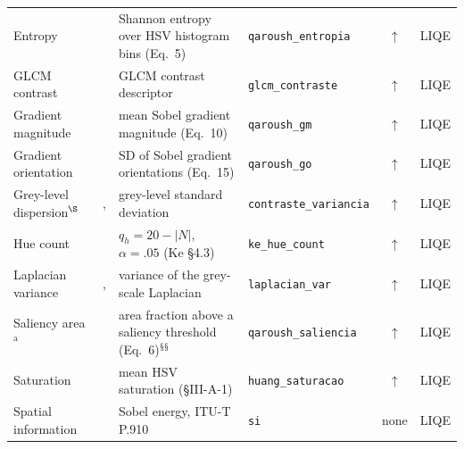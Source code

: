 \begin{table}[!ht]
\begin{tabular}{@{}>{\raggedright\arraybackslash}p{2.15cm}>{\raggedright\arraybackslash}p{1.95cm}>{\raggedright\arraybackslash}p{3.70cm}>{\raggedright\arraybackslash}p{2.55cm}c c@{}}
Entropy & \citep{qaroush2025diversity} & Shannon entropy over HSV histogram bins (Eq.~5) & \texttt{qaroush\_\allowbreak{}entropia} & $\uparrow$ & LIQE \\
\rowcolor{rowlight}GLCM contrast & \citep{yang2024keyframe} & GLCM contrast descriptor & \texttt{glcm\_\allowbreak{}contraste} & $\uparrow$ & LIQE \\
Gradient magnitude & \citep{qaroush2025diversity} & mean Sobel gradient magnitude (Eq.~10) & \texttt{qaroush\_\allowbreak{}gm} & $\uparrow$ & LIQE \\
\rowcolor{rowlight}Gradient orientation & \citep{qaroush2025diversity} & SD of Sobel gradient orientations (Eq.~15) & \texttt{qaroush\_\allowbreak{}go} & $\uparrow$ & LIQE \\
Grey-level dispersion$^{\S}$ & \citep{jeong2016static}, \citep{xu2024property} & grey-level standard deviation & \texttt{contraste\_\allowbreak{}variancia} & $\uparrow$ & LIQE \\
\rowcolor{rowlight}Hue count & \citep{ke2006highlevel} & $q_h=20-|N|$, $\alpha=.05$ (Ke \S4.3) & \texttt{ke\_\allowbreak{}hue\_\allowbreak{}count} & $\uparrow$ & LIQE \\
Laplacian variance & \citep{cakmak2025tripss}, \citep{korolkov2025keyframe} & variance of the grey-scale Laplacian & \texttt{laplacian\_\allowbreak{}var} & $\uparrow$ & LIQE \\
\rowcolor{rowlight}Saliency area$^{\mathrm{a}}$ & \citep{qaroush2025diversity} & area fraction above a saliency threshold (Eq.~6)$^{\mathsection\mathsection}$ & \texttt{qaroush\_\allowbreak{}saliencia} & $\uparrow$ & LIQE \\
Saturation & \citep{huang2024aesthetic} & mean HSV saturation (\S III-A-1) & \texttt{huang\_\allowbreak{}saturacao} & $\uparrow$ & LIQE \\
\rowcolor{rowlight}Spatial information & \citep{itu_p910} & Sobel energy, ITU-T P.910 & \texttt{si} & \textcolor{black!45}{none} & LIQE \\
\bottomrule
\end{tabular}
\end{table}
\FloatBarrier

